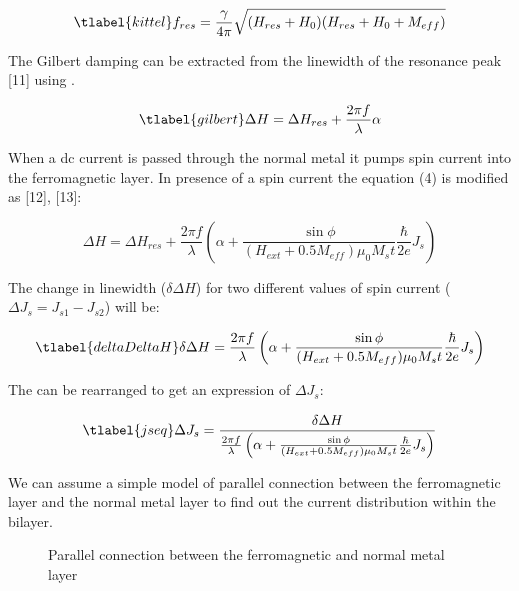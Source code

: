 \begin{equation}
    \tlabel{kittel}
    f_{res} = \frac{\gamma}{4\pi} \sqrt{(H_{res} + H_{0})(H_{res} + H_{0} + M_{eff})}
\end{equation}

The Gilbert damping can be extracted from the linewidth of the resonance peak [11] using .

\begin{equation}
    \tlabel{gilbert}
    \Delta H = \Delta H_{res} + \frac{2\pi f}{\lambda}\alpha
\end{equation}

When a dc current is passed through the normal metal it pumps spin current into the ferromagnetic 
layer. In presence of a spin current the equation (4) is modified as [12], [13]:

\begin{equation}
    \Delta H = \Delta H_{res} + \frac{2\pi f}{\lambda} \left( 
        \alpha + \frac{\sin{\phi}}{(H_{ext} + 0.5M_{eff}) \mu_{0} M_{s} t}  
        \frac{\hbar}{2e}J_{s}
    \right)
\end{equation}

The change in linewidth ($\delta \Delta H$) for two different values of spin current 
($\Delta J_{s} = J_{s1} - J_{s2}$) will be:

\begin{equation}
    \tlabel{deltaDeltaH}
    \delta \Delta H = \frac{2\pi f}{\lambda} \left( 
        \alpha + \frac{\sin{\phi}}{(H_{ext} + 0.5M_{eff}) \mu_{0} M_{s} t} 
        \frac{\hbar}{2e}J_{s}
        \right)
\end{equation}

The  can be rearranged to get an expression of $\Delta J_{s}$:

\begin{equation}
    \tlabel{jseq}
    \Delta J_{s} = \frac{\delta \Delta H}{
        \frac{2\pi f}{\lambda} \left( 
        \alpha + \frac{\sin{\phi}}{(H_{ext} + 0.5M_{eff}) \mu_{0} M_{s} t} 
        \frac{\hbar}{2e}J_{s}
        \right)
    }
\end{equation}

We can assume a simple model of parallel connection between the ferromagnetic layer and 
the normal metal layer to find out the current distribution within the bilayer.


\begin{figure}
   
    \centering
    

    \caption{Parallel connection between the ferromagnetic and normal metal layer}
    
\end{figure}

